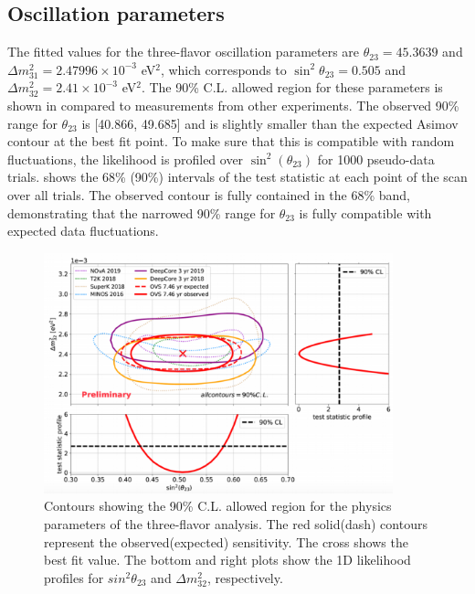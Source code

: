 \subsection{Oscillation parameters}
The fitted values for the three-flavor oscillation parameters are $\theta_{23} = 45.3639$ and $\Delta m^2_{31} = 2.47996 \times10^{-3}$ eV$^2$, which corresponds to $\sin^2\theta_{23} = 0.505$ and $\Delta m^2_{32} = 2.41 \times10^{-3}$ eV$^2$. The 90\% C.L. allowed region for these parameters is shown in  compared to measurements from other experiments. The observed 90\% range for $\theta_{23}$ is [40.866, 49.685] and is slightly smaller than the expected Asimov contour at the best fit point. To make sure that this is compatible with random fluctuations, the likelihood is profiled over $\sin^2(\theta_{23})$ for 1000 pseudo-data trials.  shows the  68\% (90\%) intervals of the test statistic at each point of the scan over all trials. The observed contour is fully contained in the 68\% band, demonstrating that the narrowed 90\% range for $\theta_{23}$ is fully compatible with expected data fluctuations.

\begin{figure}
    \centering
        \includegraphics[width=0.9\textwidth]{figures/measurement/three_flavor/results/real_data_contour.png}  
  \caption{Contours showing the 90\% C.L. allowed region for the physics parameters of the three-flavor analysis. The red solid(dash) contours represent the observed(expected) sensitivity. The cross shows the best fit value. The bottom and right plots show the 1D likelihood profiles for $sin^2\theta_{23}$ and $\Delta m^2_{32}$, respectively. 
  \label{fig:real_data_contour_three_flavor}}
\end{figure}

